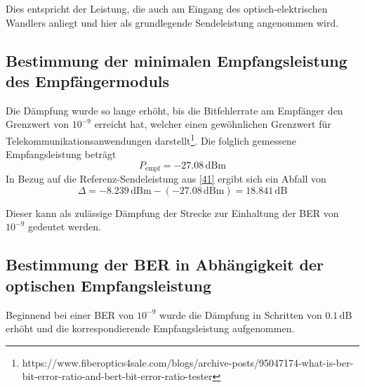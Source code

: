 \documentclass[11pt, a4paper]{article}
\newcommand{\dBm}{\si{\deci\bel}\text{m}}
\begin{document}
Dies entspricht der Leistung, die auch am Eingang des optisch-elektrischen
Wandlers anliegt und hier als grundlegende Sendeleistung angenommen wird.

\subsection{Bestimmung der minimalen Empfangsleistung des Empfängermoduls}
Die Dämpfung wurde so lange erhöht, bis die Bitfehlerrate am Empfänger den
Grenzwert von $10^{-9}$ erreicht hat, welcher einen gewöhnlichen Grenzwert für
Telekommunikationsanwendungen darstellt\footnote{https://www.fiberoptics4sale.com/blogs/archive-posts/95047174-what-is-ber-bit-error-ratio-and-bert-bit-error-ratio-tester}.
Die folglich gemessene Empfangsleistung beträgt
\[P_{\text{empf}} = -27.08 \, \dBm\]
In Bezug auf die Referenz-Sendeleistung aus \ref{41} ergibt sich ein Abfall von
\[\Delta = -8.239 \,\dBm - (-27.08 \,\dBm) = 18.841 \, \si{\deci\bel}\]

Dieser kann als zulässige Dämpfung der Strecke zur Einhaltung der BER von
$10^{-9}$ gedeutet werden.


\subsection{Bestimmung der BER in Abhängigkeit der optischen Empfangsleistung}
Beginnend bei einer BER von $10^{-9}$ wurde die Dämpfung in Schritten von $0.1
\, \si{\deci\bel}$ erhöht und die korrespondierende Empfangsleistung aufgenommen.
\end{document}
